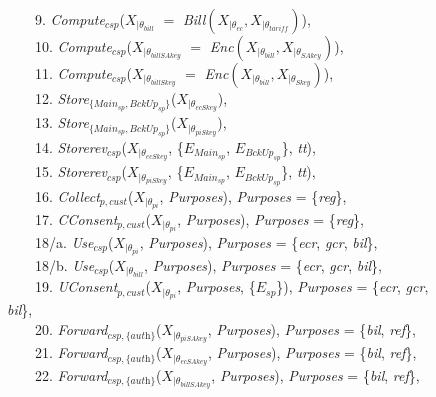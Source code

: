 \documentclass[a4paper]{article}
\begin{document}
\begin{figure}[htbp]
{\begin{minipage}{15.87 cm}
\begin{tabbing}
\ \ \ \ 9. \textit{Compute}$_{csp}$($X_{|\theta_{bill}}$ $=$ \textit{Bill}$(X_{|\theta_{ec}}, X_{|\theta_{\textit{tariff}}})$),\\ 
\ \ \ \ 10. \textit{Compute}$_{csp}$($X_{|\theta_{billSAkey}}$ $=$ \textit{Enc}$(X_{|\theta_{bill}}, X_{|\theta_{SAkey}})$),\\
\ \ \ \ 11. \textit{Compute}$_{csp}$($X_{|\theta_{billSkey}}$ $=$ \textit{Enc}$(X_{|\theta_{bill}}, X_{|\theta_{Skey}})$),\\
\ \ \ \ 12. \textit{Store}$_{\{Main_{sp}, BckUp_{sp}\}}$($X_{|\theta_{ecSkey}}$),\\ 
\ \ \ \ 13. \textit{Store}$_{\{Main_{sp}, BckUp_{sp}\}}$($X_{|\theta_{piSkey}}$),\\ 
\ \ \ \ 14. \textit{Storerev}$_{csp}$($X_{|\theta_{ecSkey}}$, \{$E_{\textit{Main}_{sp}}$,  $E_{\textit{BckUp}_{sp}}$\}, \textit{tt}),\\ 
\ \ \ \ 15. \textit{Storerev}$_{csp}$($X_{|\theta_{piSkey}}$, \{$E_{\textit{Main}_{sp}}$,  $E_{\textit{BckUp}_{sp}}$\}, \textit{tt}),
\\ \ \ \ \ 16. \textit{Collect}$_{p,cust}$($X_{|\theta_{pi}}$, \textit{Purposes}), \textit{Purposes} = \{\textit{reg}\},\\
\ \ \ \  17. \textit{CConsent}$_{p,cust}$($X_{|\theta_{pi}}$, \textit{Purposes}), \textit{Purposes} = \{\textit{reg}\},\\ 
\ \ \ \ 18/a. \textit{Use}$_{\textit{csp}}$($X_{|\theta_{pi}}$, \textit{Purposes}), \textit{Purposes} = \{\textit{ecr},   \textit{gcr}, \textit{bil}\},\\ 
\ \ \ \ 18/b. \textit{Use}$_{\textit{csp}}$($X_{|\theta_{bill}}$, \textit{Purposes}), \textit{Purposes} = \{\textit{ecr},   \textit{gcr}, \textit{bil}\},\\ 
\ \ \ \ 19. \textit{UConsent}$_{p,cust}$($X_{|\theta_{pi}}$, \textit{Purposes}, \{$E_{sp}$\}), \textit{Purposes} = \{\textit{ecr},   \textit{gcr}, \textit{bil}\},\\ 
\ \ \ \ 20. \textit{Forward}$_{csp,\{\textit{auth}\}}$($X_{|\theta_{piSAkey}}$, \textit{Purposes}), \textit{Purposes} = \{\textit{bil},  \textit{ref}\},\\ 
\ \ \ \ 21. \textit{Forward}$_{csp,\{\textit{auth}\}}$($X_{|\theta_{ecSAkey}}$, \textit{Purposes}), \textit{Purposes} = \{\textit{bil},  \textit{ref}\},\\ 
\ \ \ \ 22. \textit{Forward}$_{csp,\{\textit{auth}\}}$($X_{|\theta_{billSAkey}}$, \textit{Purposes}), \textit{Purposes} = \{\textit{bil},  \textit{ref}\},\\ 

\end{tabbing}
\end{minipage}}
\end{figure}
\end{document}
